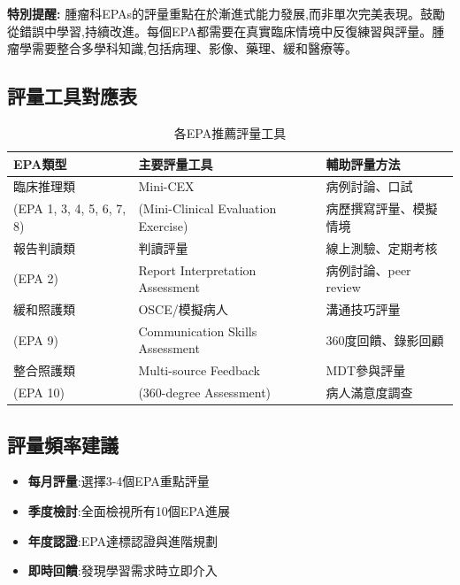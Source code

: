 \documentclass[12pt,a4paper]{article}
\begin{document}
\begin{importantbox}
\textbf{特別提醒:} 腫瘤科EPAs的評量重點在於漸進式能力發展,而非單次完美表現。鼓勵從錯誤中學習,持續改進。每個EPA都需要在真實臨床情境中反復練習與評量。腫瘤學需要整合多學科知識,包括病理、影像、藥理、緩和醫療等。
\end{importantbox}

\subsection{評量工具對應表}
\begin{table}[h]
    \centering
    \caption{各EPA推薦評量工具}
    \begin{tabular}{p{4.5cm} p{4cm} p{5.5cm}}
        \toprule
        \textbf{EPA類型} & \textbf{主要評量工具} & \textbf{輔助評量方法} \\
        \midrule
        臨床推理類 & Mini-CEX & 病例討論、口試 \\
        (EPA 1, 3, 4, 5, 6, 7, 8) & (Mini-Clinical Evaluation Exercise) & 病歷撰寫評量、模擬情境 \\
        \midrule
        報告判讀類 & 判讀評量 & 線上測驗、定期考核 \\
        (EPA 2) & Report Interpretation Assessment & 病例討論、peer review \\
        \midrule
        緩和照護類 & OSCE/模擬病人 & 溝通技巧評量 \\
        (EPA 9) & Communication Skills Assessment & 360度回饋、錄影回顧 \\
        \midrule
        整合照護類 & Multi-source Feedback & MDT參與評量 \\
        (EPA 10) & (360-degree Assessment) & 病人滿意度調查 \\
        \bottomrule
    \end{tabular}
\end{table}

\subsection{評量頻率建議}
\begin{itemize}[nosep]
    \item \textbf{每月評量}:選擇3-4個EPA重點評量
    \item \textbf{季度檢討}:全面檢視所有10個EPA進展
    \item \textbf{年度認證}:EPA達標認證與進階規劃
    \item \textbf{即時回饋}:發現學習需求時立即介入
\end{itemize}
\end{document}

